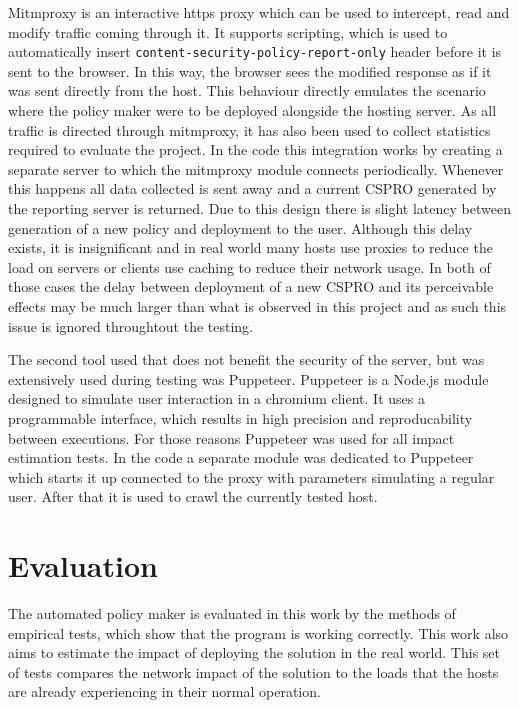 Mitmproxy is an interactive https proxy which can be used to intercept, read and modify traffic coming through it.
It supports scripting, which is used to automatically insert \texttt{content-security-policy-report-only} header before it is sent to the browser.
In this way, the browser sees the modified response as if it was sent directly from the host.
This behaviour directly emulates the scenario where the policy maker were to be deployed alongside the hosting server.
As all traffic is directed through mitmproxy, it has also been used to collect statistics required to evaluate the project.
In the code this integration works by creating a separate server to which the mitmproxy module connects periodically.
Whenever this happens all data collected is sent away and a current CSPRO generated by the reporting server is returned.
Due to this design there is slight latency between generation of a new policy and deployment to the user.
Although this delay exists, it is insignificant and in real world many hosts use proxies to reduce the load on servers or clients use caching to reduce their network usage.
In both of those cases the delay between deployment of a new CSPRO and its perceivable effects may be much larger than what is observed in this project and as such this issue is ignored throughtout the testing.

The second tool used that does not benefit the security of the server, but was extensively used during testing was Puppeteer.
Puppeteer is a Node.js module designed to simulate user interaction in a chromium client.
It uses a programmable interface, which results in high precision and reproducability between executions.
For those reasons Puppeteer was used for all impact estimation tests.
In the code a separate module was dedicated to Puppeteer which starts it up connected to the proxy with parameters simulating a regular user.
After that it is used to crawl the currently tested host.

\section{Evaluation}

The automated policy maker is evaluated in this work by the methods of empirical tests, which show that the program is working correctly.
This work also aims to estimate the impact of deploying the solution in the real world.
This set of tests compares the network impact of the solution to the loads that the hosts are already experiencing in their normal operation.


